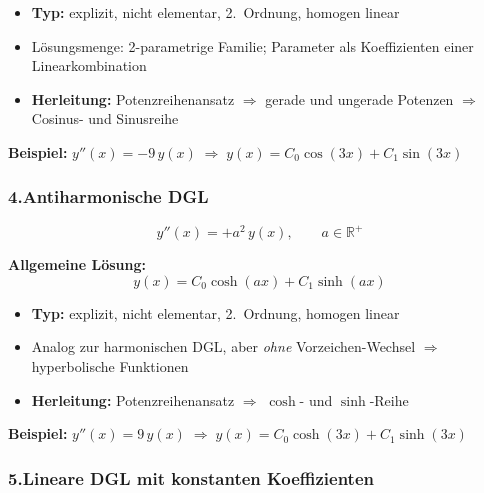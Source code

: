 \documentclass[../../zusammenfassung_AN.tex]{subfiles}
\begin{document}
	\begin{itemize}[noitemsep, topsep=2pt]
		\item \textbf{Typ:} explizit, nicht elementar, 2.\ Ordnung, homogen linear
		\item Lösungsmenge: 2-parametrige Familie; Parameter als Koeffizienten einer Linearkombination
		\item \textbf{Herleitung:} Potenzreihenansatz $\Rightarrow$ gerade und ungerade Potenzen $\Rightarrow$ Cosinus- und Sinusreihe
	\end{itemize}
	
	\textbf{Beispiel:} $y''(x)=-9\,y(x) \;\Rightarrow\; y(x) = C_0\cos(3x) + C_1\sin(3x)$
	
	\vspace{0.8em}
	
	\subsubsection*{\color{mainblue}4.\quad Antiharmonische DGL}
	
	\[
	y''(x) = +a^2\,y(x), \qquad a \in \mathbb{R}^+
	\]
	
	\begin{tcolorbox}[formelbox]
		\textbf{Allgemeine Lösung:}
		\[
		\boxed{y(x) = C_0\cosh(ax) + C_1\sinh(ax)}
		\]
	\end{tcolorbox}
	
	\begin{itemize}[noitemsep, topsep=2pt]
		\item \textbf{Typ:} explizit, nicht elementar, 2.\ Ordnung, homogen linear
		\item Analog zur harmonischen DGL, aber \emph{ohne} Vorzeichen-Wechsel $\Rightarrow$ hyperbolische Funktionen
		\item \textbf{Herleitung:} Potenzreihenansatz $\Rightarrow$ $\cosh$- und $\sinh$-Reihe
	\end{itemize}
	
	\textbf{Beispiel:} $y''(x)=9\,y(x) \;\Rightarrow\; y(x) = C_0\cosh(3x) + C_1\sinh(3x)$
	
	\vspace{0.8em}
	
	\subsubsection*{\color{mainblue}5.\quad Lineare DGL mit konstanten Koeffizienten}
	
\end{document}
